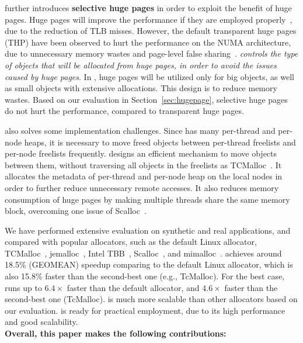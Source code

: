 \NM{} further introduces \textbf{selective huge pages} in order to exploit the benefit of huge pages. Huge pages will improve the performance if they are employed properly~\cite{DBLP:conf/asplos/MaasAIJMR20}, due to the reduction of TLB misses. However, the default transparent huge pages (THP) have been observed to hurt the performance on the NUMA architecture, due to unnecessary memory wastes and page-level false sharing~\cite{Gaud:2014:LPM:2643634.2643659, DBLP:conf/asplos/PanwarBG19, DBLP:conf/asplos/MaasAIJMR20}. \textit{\NM{} controls the type of objects that will be allocated from huge pages, in order to avoid the issues caused by huge pages}. In \NM{}, huge pages will be utilized only for big objects, as well as small objects with extensive allocations. This design is to reduce memory wastes. Based on our evaluation in Section~\ref{sec:hugepage}, \NM{} selective huge pages do not hurt the performance, compared to transparent huge pages.
 
\NM{} also solves some implementation challenges. Since \NM{} has many per-thread and per-node heaps, it is necessary to move freed objects between per-thread freelists and per-node freelists frequently. \NM{} designs an efficient mechanism to move objects between them, without traversing all objects in the freelists as TCMalloc~\cite{tcmalloc}. It allocates the metadata of per-thread and per-node heap on the local nodes in order to further reduce unnecessary remote accesses.  It also reduces memory consumption of huge pages by making multiple threads share the same memory block, overcoming one issue of Scalloc~\cite{Scalloc}. 

We have performed extensive evaluation on synthetic and real applications, and compared \NM{} with popular allocators, such as the default Linux allocator, TCMalloc~\cite{tcmalloc}, jemalloc~\cite{jemalloc}, Intel TBB~\cite{tbb}, Scalloc~\cite{Scalloc}, and mimalloc~\cite{mimalloc}. \NM{} achieves around 18.5\%  (GEOMEAN) speedup comparing to the default Linux allocator, which is also 15.8\% faster than the second-best one (e.g., TcMalloc). For the best case, \NM{} runs up to $6.4\times$ faster than the default allocator, and $4.6\times$ faster than the second-best one (TcMalloc). \NM{} is much more scalable than other allocators based on our evaluation. \NM{} is ready for practical employment, due to its high performance and good scalability. \\

\textbf{Overall, this paper makes the following contributions:} 

